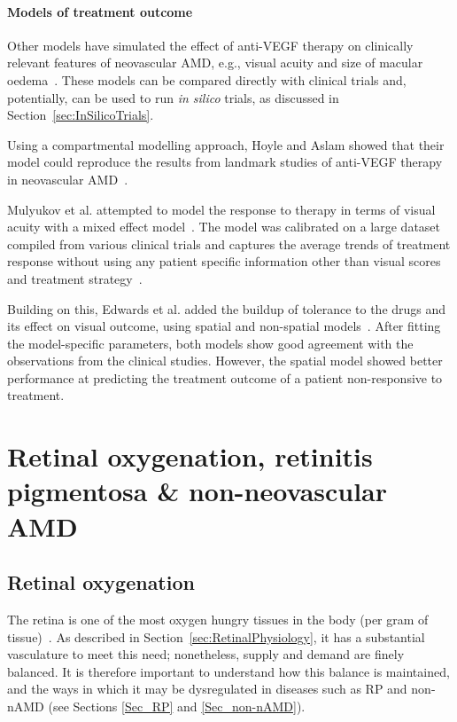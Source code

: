 \documentclass{article}
\begin{document}
\paragraph*{Models of treatment outcome}

Other models have simulated the effect of anti-VEGF therapy on clinically relevant features of neovascular AMD, e.g., visual acuity and size of macular oedema~\cite{Edwards_2020, Hoyle_2017, Mulyukov_2018}.
These models can be compared directly with clinical trials and, potentially, can be used to run \textit{in silico} trials, as discussed in Section~\ref{sec:InSilicoTrials}.

Using a compartmental modelling approach, Hoyle and Aslam showed that their model could reproduce the results from landmark studies of anti-VEGF therapy in neovascular AMD~\cite{Hoyle_2017}.

Mulyukov et al. attempted to model the response to therapy in terms of visual acuity with a mixed effect model~\cite{Mulyukov_2018}.
The model was calibrated on a large dataset compiled from various clinical trials and captures the average trends of treatment response without using any patient specific information other than visual scores and treatment strategy~\cite{Mulyukov_2018}.

Building on this, Edwards et al. added the buildup of tolerance to the drugs and its effect on visual outcome, using spatial and non-spatial models~\cite{Edwards_2020}.
After fitting the model-specific parameters, both models show good agreement with the observations from the clinical studies.
However, the spatial model showed better performance at predicting the treatment outcome of a patient non-responsive to treatment.



\section{Retinal oxygenation, retinitis pigmentosa \& non-neovascular AMD}\label{Sec_Ox_RP_non-nAMD}
%
%
\subsection{Retinal oxygenation}\label{Sec_Oxygen}
%
The retina is one of the most oxygen hungry tissues in the body (per gram of tissue)~\cite{Anderson_1968,Anderson_and_Saltzman_1964,Yu_and_Cringle_2001,W-Wirawan_and_Linsenmeier_2003}. As described in Section~\ref{sec:RetinalPhysiology}, it has a substantial vasculature to meet this need; nonetheless, supply and demand are finely balanced. It is therefore important to understand how this balance is maintained, and the ways in which it may be dysregulated in diseases such as RP and non-nAMD (see Sections \ref{Sec_RP} and \ref{Sec_non-nAMD}).
\end{document}
